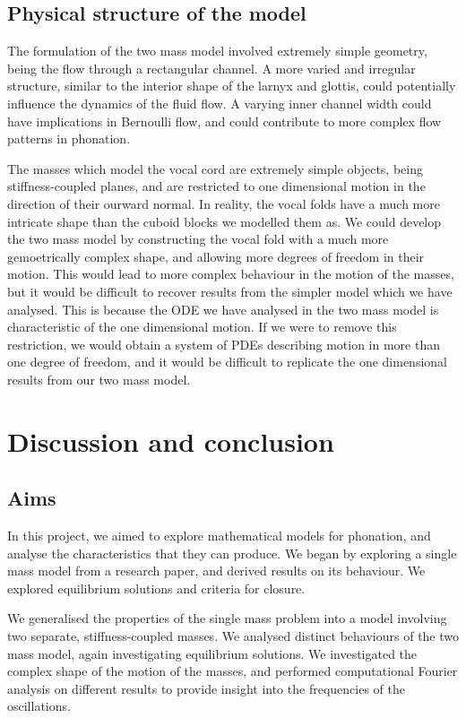 \documentclass{report}
\begin{document}
\section{Physical structure of the model}

The formulation of the two mass model involved extremely simple geometry,
being the flow through a rectangular channel.
A more varied and irregular structure,
similar to the interior shape of the larnyx and glottis,
could potentially influence the dynamics of the fluid flow.
A varying inner channel width could have implications in Bernoulli flow,
and could contribute to more complex flow patterns in phonation.

The masses which model the vocal cord are extremely simple objects,
being stiffness-coupled planes,
and are restricted to one dimensional motion in the direction of their ourward normal.
In reality, the vocal folds have a much more intricate shape than the cuboid blocks we modelled them as.
We could develop the two mass model by constructing the vocal fold with a much more gemoetrically complex shape,
and allowing more degrees of freedom in their motion.
This would lead to more complex behaviour in the motion of the masses,
but it would be difficult to recover results from the simpler model which we have analysed.
This is because the ODE we have analysed in the two mass model is characteristic of the one dimensional motion.
If we were to remove this restriction,
we would obtain a system of PDEs describing motion in more than one degree of freedom,
and it would be difficult to replicate the one dimensional results from our two mass model.


\chapter{Discussion and conclusion}

\section{Aims}

In this project,
we aimed to explore mathematical models for phonation,
and analyse the characteristics that they can produce.
We began by exploring a single mass model from a research paper,
and derived results on its behaviour.
We explored equilibrium solutions and criteria for closure.

We generalised the properties of the single mass problem into a model involving two separate, stiffness-coupled masses.
We analysed distinct behaviours of the two mass model,
again investigating equilibrium solutions.
We investigated the complex shape of the motion of the masses,
and performed computational Fourier analysis on different results to provide insight into the frequencies of the oscillations.
\end{document}
